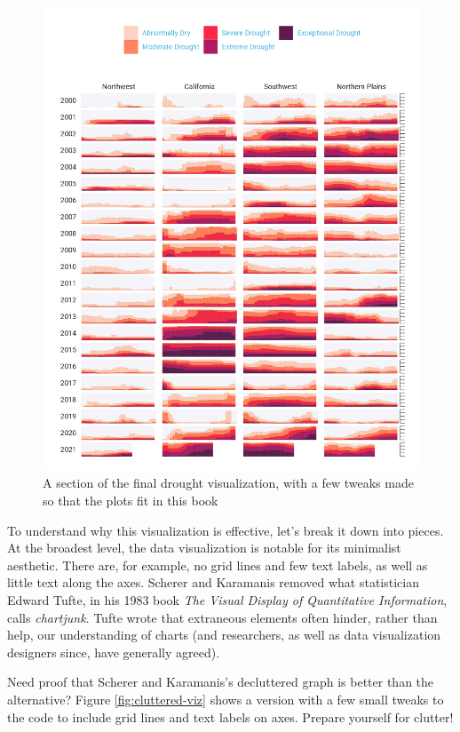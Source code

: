 \documentclass[
]{book}
\begin{document}
\begin{figure}
\includegraphics[width=1\linewidth]{data-viz_files/figure-latex/final-viz-1} \caption{A section of the final drought visualization, with a few tweaks made so that the plots fit in this book}\label{fig:final-viz}
\end{figure}

To understand why this visualization is effective, let's break it down into pieces. At the broadest level, the data visualization is notable for its minimalist aesthetic. There are, for example, no grid lines and few text labels, as well as little text along the axes. Scherer and Karamanis removed what statistician Edward Tufte, in his 1983 book \emph{The Visual Display of Quantitative Information}, calls \emph{chartjunk}. Tufte wrote that extraneous elements often hinder, rather than help, our understanding of charts (and researchers, as well as data visualization designers since, have generally agreed).

Need proof that Scherer and Karamanis's decluttered graph is better than the alternative? Figure \ref{fig:cluttered-viz} shows a version with a few small tweaks to the code to include grid lines and text labels on axes. Prepare yourself for clutter!
\end{document}
